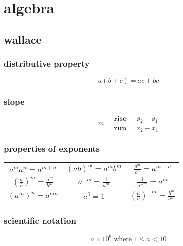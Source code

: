 \documentclass[a4paper,12pt]{article}
\author{m7tkr}
\begin{document}
\tableofcontents

\section{algebra}

\subsection{wallace}

\subsubsection{distributive property}

\[ a(b+c)=ac+bc \]

\subsubsection{slope}

\[ \mathit{m}=\frac{\textbf{rise}}{\textbf{run}}=\frac{y_2-y_1}{x_2-x_1} \]

\subsubsection{properties of exponents}
\begin{center}

        \begin{tabular}{*{3}c}
            
                \( a^{m}a^n=a^{m+n} \)                           & \(
                (ab)^m=a^{m}b^{m} \)    & \( \frac{a^m}{a^n}=a^{m-n} \) \\[10pt]
                \( \left(\frac{a}{b}\right)^m=\frac{a^m}{b^m} \) & \( a^{-m}=\frac{1}{a^m} \) & \( \frac{1}{a^{-m}}=a^m \)    \\[10pt]
                \( (a^m)^n=a^{mn} \)                             & \( a^0=1 \)                & \(
                \left(\frac{a}{b}\right)^{-m}=\frac{b^m}{a^m} \)                                                              \\
        \end{tabular}
\end{center}

\subsubsection{scientific notation}

\[ a \times 10^b \text{ where } 1 \leqslant a < 10 \]
\end{document}
